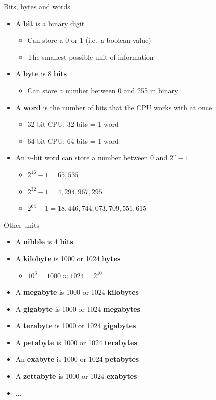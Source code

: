 \begin{frame}{Bits, bytes and words}
	\begin{itemize}
		\pause\item A \textbf{bit} is a \uline{b}inary dig\uline{it}
			\begin{itemize}
				\pause\item Can store a 0 or 1 (i.e.\ a boolean value)
				\pause\item The smallest possible unit of information
			\end{itemize}
		\pause\item A \textbf{byte} is 8 \textbf{bits}
			\begin{itemize}
				\pause\item Can store a number between 0 and 255 in binary
			\end{itemize}
		\pause\item A \textbf{word} is the number of bits that the CPU works with at once
			\begin{itemize}
				\pause\item 32-bit CPU: 32 bits = 1 word
				\pause\item 64-bit CPU: 64 bits = 1 word
			\end{itemize}
		\pause\item An $n$-bit word can store a number between 0 and $2^{n} - 1$
			\begin{itemize}
				\pause\item $2^{16}-1 = 65,535$
				\pause\item $2^{32}-1 = 4,294,967,295$
				\pause\item $2^{64}-1 = 18,446,744,073,709,551,615$
			\end{itemize}
	\end{itemize}
\end{frame}

\begin{frame}{Other units}
    \begin{itemize}
        \pause\item A \textbf{nibble} is 4 \textbf{bits}
        \pause\item A \textbf{kilobyte} is 1000 or 1024 \textbf{bytes}
            \begin{itemize}
                \pause\item $10^3 = 1000 \approx 1024 = 2^{10}$
            \end{itemize}
        \pause\item A \textbf{megabyte} is 1000 or 1024 \textbf{kilobytes}
        \pause\item A \textbf{gigabyte} is 1000 or 1024 \textbf{megabytes}
        \pause\item A \textbf{terabyte} is 1000 or 1024 \textbf{gigabytes}
        \pause\item A \textbf{petabyte} is 1000 or 1024 \textbf{terabytes}
        \pause\item An \textbf{exabyte} is 1000 or 1024 \textbf{petabytes}
        \pause\item A \textbf{zettabyte} is 1000 or 1024 \textbf{exabytes}
        \pause\item $\dots$
    \end{itemize}
\end{frame}

